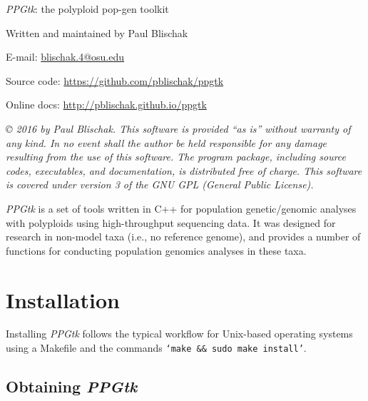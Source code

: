 \documentclass[11pt,english,letterpaper,oneside]{article}
\newcommand{\ppgtk}{\textit{PPGtk}}
\begin{document}
\pagestyle{empty}

\vspace*{1.5in}
\begin{center}

	{\huge \ppgtk: the polyploid pop-gen toolkit}
	\vspace{0.5in}

	Written and maintained by Paul Blischak

	E-mail: \href{mailto:blischak.4@osu.edu}{blischak.4@osu.edu}

	Source code: \url{https://github.com/pblischak/ppgtk}

	Online docs: \url{http://pblischak.github.io/ppgtk}

\end{center}

\vspace{4in}

{\small \textit{\copyright{} 2016 by Paul Blischak. This software is provided ``as is'' without warranty of any kind. In no event shall the author be held responsible for any damage resulting from the use of this software. The program package, including source codes, executables, and documentation, is distributed free of charge. This software is covered under version 3 of the GNU GPL (General Public License).}}

\newpage

\tableofcontents

\newpage

\clearpage
\pagestyle{plain}
\setcounter{page}{1}

\ppgtk{} is a set of tools written in C++ for population genetic/genomic analyses with polyploids using high-throughput sequencing data. It was designed for research in non-model taxa (i.e., no reference genome), and provides a number of functions for conducting population genomics analyses in these taxa.

\section{Installation}

Installing \ppgtk{} follows the typical workflow for Unix-based operating systems using a Makefile and the commands \texttt{`make \&\& sudo make install'}.

\subsection{Obtaining \ppgtk}
\end{document}
